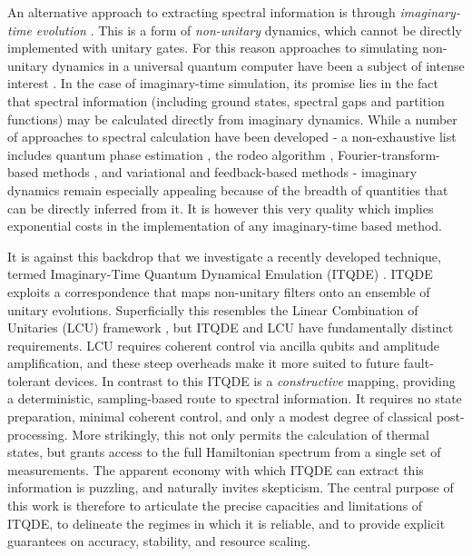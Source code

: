 \documentclass[reprint, aps,prx,showpacs,bibfootnote,preprintnumbers, mathtools, superscriptaddress, amsmath,amssymb]{revtex4-2}
\begin{document}
An alternative approach to extracting spectral information is through \textit{imaginary-time evolution} \cite{mcmahon_equating_2025,alipour_state-based_2025}. This is a form of \textit{non-unitary} dynamics, which cannot be directly implemented with unitary gates. For this reason approaches to simulating non-unitary dynamics in a universal quantum computer have been a subject of intense interest  \cite{HamSim, Schrodingerisation, an_linear_2023, NOVIKAU2025109498}. In the case of imaginary-time simulation, its promise lies in the fact that spectral information (including ground states, spectral gaps and partition functions) may be calculated directly from imaginary dynamics. While a number of approaches to spectral calculation have been developed - a non-exhaustive list includes quantum phase estimation \cite{parker_quantum_2020, kitaev_classical_2002, nielsen_quantum_2010, svore_faster_2013, obrien_quantum_2019, wiebe_efficient_2016, dobsicek_arbitrary_2007}, the rodeo algorithm \cite{choi_rodeo_2021, cohen_optimizing_2023}, Fourier-transform-based methods \cite{somma_quantum_2020,gnatenko_detection_2022, gnatenko_energy_2022}, and variational \cite{xie_variational_2024, jones_variational_2019} and feedback-based \cite{rahman2024feedback,larsen_feedback-based_2024} methods - imaginary dynamics remain especially appealing because of the breadth of quantities that can be directly inferred from it. It is however this very quality which implies exponential costs in the implementation of any imaginary-time based method.

It is against this backdrop that we investigate a recently developed technique, termed Imaginary-Time Quantum Dynamical Emulation (ITQDE) \cite{leamer_quantum_2024}. ITQDE exploits a correspondence that maps non-unitary filters onto an ensemble of unitary evolutions. Superficially this resembles the Linear Combination of Unitaries (LCU) framework \cite{an_linear_2023}, but ITQDE and LCU have fundamentally distinct requirements. LCU requires coherent control via ancilla qubits and amplitude amplification, and these steep overheads make it more suited to future fault-tolerant devices. In contrast to this ITQDE is a \textit{constructive} mapping, providing a deterministic, sampling-based route to spectral information. It requires no state preparation, minimal coherent control, and only a modest degree of classical post-processing. More strikingly, this not only permits the calculation of thermal states, but grants access to the full Hamiltonian spectrum from a single set of measurements. The apparent economy with which ITQDE can extract this information is puzzling, and naturally invites skepticism. The central purpose of this work is therefore to articulate the precise capacities and limitations of ITQDE, to delineate the regimes in which it is reliable, and to provide explicit guarantees on accuracy, stability, and resource scaling.
\end{document}
